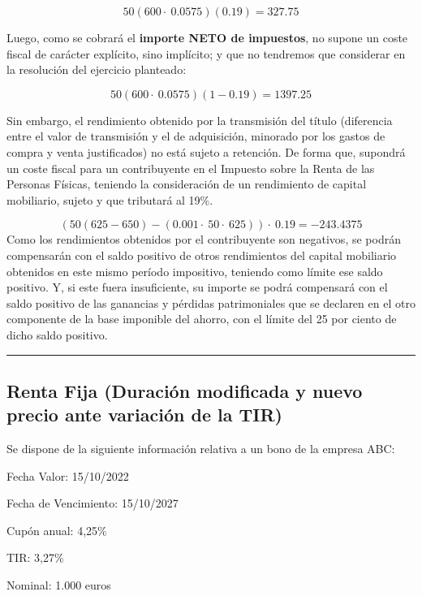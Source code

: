 \documentclass[
  letterpaper,
  DIV=11,
  numbers=noendperiod]{scrreprt}
\begin{document}
\begin{tcolorbox}
\begin{tcolorbox}
\[50\left(600\cdot \:0.0575\right)\left(0.19\right)=327.75\]

Luego, como se cobrará el \textbf{importe NETO de impuestos}, no supone
un coste fiscal de carácter explícito, sino implícito; y que no
tendremos que considerar en la resolución del ejercicio planteado:

\[50\left(600\cdot \:0.0575\right)\left(1-0.19\right)=1397.25\]

Sin embargo, el rendimiento obtenido por la transmisión del título
(diferencia entre el valor de transmisión y el de adquisición, minorado
por los gastos de compra y venta justificados) no está sujeto a
retención. De forma que, supondrá un coste fiscal para un contribuyente
en el Impuesto sobre la Renta de las Personas Físicas, teniendo la
consideración de un rendimiento de capital mobiliario, sujeto y que
tributará al 19\%.

\[\left(50\left(625-650\right)-\left(0.001\cdot \:50\cdot \:625\right)\right)\cdot \:0.19=-243.4375\]
Como los rendimientos obtenidos por el contribuyente son negativos, se
podrán compensarán con el saldo positivo de otros rendimientos del
capital mobiliario obtenidos en este mismo período impositivo, teniendo
como límite ese saldo positivo. Y, si este fuera insuficiente, su
importe se podrá compensará con el saldo positivo de las ganancias y
pérdidas patrimoniales que se declaren en el otro componente de la base
imponible del ahorro, con el límite del 25 por ciento de dicho saldo
positivo.

\end{tcolorbox}

\begin{center}\rule{0.5\linewidth}{0.5pt}\end{center}

\subsection{Renta Fija (Duración modificada y nuevo precio ante
variación de la
TIR)}\label{renta-fija-duraciuxf3n-modificada-y-nuevo-precio-ante-variaciuxf3n-de-la-tir}

Se dispone de la siguiente información relativa a un bono de la empresa
ABC:

Fecha Valor: 15/10/2022

Fecha de Vencimiento: 15/10/2027

Cupón anual: 4,25\%

TIR: 3,27\%

Nominal: 1.000 euros


\end{tcolorbox}
\end{document}
